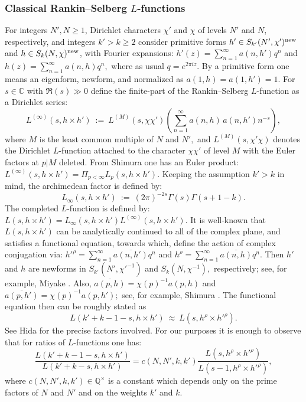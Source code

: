 \documentclass[11pt]{amsart}
\begin{document}
\subsubsection{Classical Rankin--Selberg $L$-functions}
\label{section: classical-rankin-selberg}
For integers $N', N \geq 1$, Dirichlet characters $\chi'$ and $\chi$ of levels $N'$ and $N$, respectively, and 
integers $k' > k \geq 2$ consider primitive forms 
$h' \in S_{k'}(N',\chi')^{\textup{new}}$ and $h \in S_k(N,\chi)^{\textup{new}}$, with Fourier expansions: 
$h'(z) = \sum_{n=1}^\infty a(n,h')q^n$ and $h(z) = \sum_{n=1}^\infty a(n,h)q^n,$ where as usual $q = e^{2\pi i z}.$
By a primitive form one means an eigenform, newform, and normalized as $a(1,h) = a(1,h') = 1$. 
For $s\in \mathbb{C}$ with $\Re(s) \gg 0$ define the finite-part of the Rankin--Selberg $L$-function as a Dirichlet series:
$$
L^{(\infty)}(s, h \times h') \ := \ L^{(M)}(s, \chi \chi') \left( \sum_{n=1}^\infty a(n,h) \, a(n,h')n^{-s}\right),
$$
where $M$ is the least common multiple of $N$ and $N',$ and $L^{(M)}(s, \chi'\chi)$ denotes the Dirichlet $L$-function attached to the character $\chi\chi'$ 
of level $M$ with the Euler factors at $p|M$ deleted. 
From Shimura \cite[Lem.\,1]{shimura-cusp} one has an Euler product: $L^{(\infty)}(s, h \times h') =\Pi_{p < \infty} L_p(s, h \times h' ).$ 
Keeping the assumption $k' > k$ in mind, the archimedean factor is defined by:
$$	
L_\infty(s, h \times h') \ := \ (2\pi)^{-2s} \Gamma(s)\Gamma(s + 1 - k).
$$
The completed $L$-function is defined by: $L(s, h \times h') = L_\infty(s, h \times h') L^{(\infty)}(s, h \times h').$
It is well-known that $L(s, h \times h')$ can be analytically continued to all of the complex plane, and satisfies a functional equation, towards which, 
define the action of complex conjugation via: 
$h'^\rho = \sum_{n=1}^\infty \overline{a(n,h')} q^n$ and $h^\rho = \sum_{n=1}^\infty \overline{a(n,h)}q^n.$ 
Then $h'$ and $h$ are newforms in $S_{k'}(N', \chi'^{-1})$ and $S_k(N, \chi^{-1}),$ respectively; 
see, for example, Miyake \cite[Thm.\,4.6.15]{miyake}. 
Also, $\overline{a(p,h)} = \chi(p)^{-1} a(p,h)$ and $\overline{a(p,h')} = \chi(p)^{-1} a(p,	h');$ see, for example, 
Shimura \cite[Prop.\,3.56]{iataf}. The functional equation then can be roughly stated as
$$
L(k'+k - 1 -s, h \times h') \ \approx \ L(s,h^\rho \times h'^\rho). 
$$
See Hida \cite[Thm.\,9.1]{hida-measure} for the precise factors involved. For our purposes it is enough to observe that for ratios of 
$L$-functions one has: 
\begin{equation}\label{eqn: relation-between-ratios}
	\dfrac{L(k'+k - 1 - s, h \times h')}{L(k'+k -s,h \times h')} = c(N,N',k,k')\dfrac{L(s, h^\rho\times h'^\rho)}{L(s-1, h^\rho \times h'^\rho)}, 
\end{equation}
where $c(N,N',k,k') \in \mathbb{Q}^\times$ is a constant which depends only on the prime factors of $N$ and $N'$ and on the weights $k'$ and $k$.
\end{document}
